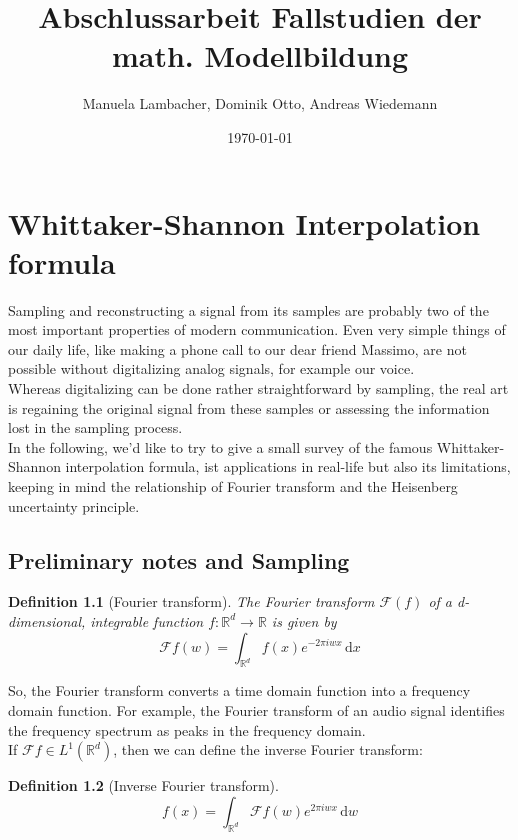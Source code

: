 \documentclass[a4paper, 11pt]{scrreprt}
\title{Abschlussarbeit Fallstudien der math. Modellbildung}
\author{Manuela Lambacher, Dominik Otto, Andreas Wiedemann}
\date{\today}
\newtheorem{defi}{Definition}[section]
\newcommand{\RR}{\mathbb{R}}
\newcommand{\FF}{\mathcal{F}}
\begin{document}
\parindent 0pt
\maketitle
\tableofcontents

\chapter{Whittaker-Shannon Interpolation formula}

Sampling and reconstructing a signal from its samples are probably two of the most important properties of modern communication.   Even very simple things of our daily life, like making a phone call to our dear friend Massimo, are not possible without digitalizing analog signals, for example  our voice. \\
Whereas digitalizing can be done rather  straightforward by sampling, the real art is regaining the original signal from these samples or assessing the information lost in the sampling process.\\
In the following, we'd like to try to give a small survey of the famous Whittaker-Shannon interpolation formula, ist applications in real-life but also its limitations, keeping in mind the relationship of Fourier transform and the Heisenberg uncertainty principle.


\section{Preliminary notes and Sampling}
\begin{defi}[Fourier transform]
The Fourier transform \(\FF(f)\) of a d-dimensional, integrable function \(f:\RR^d \to \RR\) is given by
	\begin{equation}
		\FF f(w)=\int_{\RR^d} f(x)e^{-2\pi iwx}\,\mathrm{d}x
	\end{equation}

\end{defi}
So, the Fourier transform converts a time domain function into a frequency domain function. For example, the Fourier transform of an audio signal identifies the frequency spectrum as peaks in the frequency domain.\\
If \(\FF f\in L^1(\RR^d)\), then we can define the inverse Fourier transform:
\begin{defi}[Inverse Fourier transform]
\begin{equation}
	f(x) = \int_{\RR^d} \FF f(w) e^{2\pi iwx}\,\mathrm{d}w
\end{equation}
\end{defi}
\end{document}
